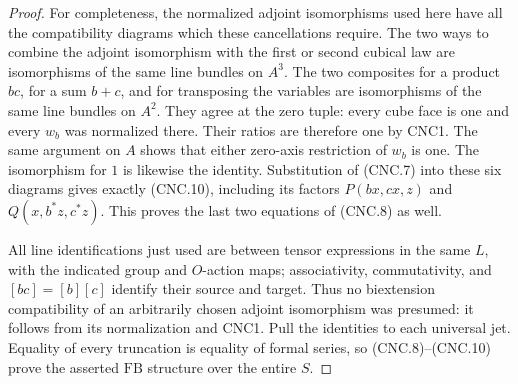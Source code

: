 \begin{proof}
For completeness, the normalized adjoint isomorphisms used here have
all the compatibility diagrams which these cancellations require.
The two ways to combine the adjoint isomorphism with the first or
second cubical law are isomorphisms of the same line bundles on
\(A^3\).  The two composites for a product \(bc\), for a sum
\(b+c\), and for transposing the variables are isomorphisms of
the same line bundles on \(A^2\).  They agree at the zero tuple:
every cube face is one and every \(w_b\) was normalized there.
Their ratios are therefore one by CNC1.  The same argument on \(A\)
shows that either zero-axis restriction of \(w_b\) is one.  The
isomorphism for \(1\) is likewise the identity.  Substitution of
(CNC.7) into these six diagrams gives exactly (CNC.10), including its
factors \(P(bx,cx,z)\) and \(Q(x,b^*z,c^*z)\).
This proves the last two equations of (CNC.8) as well.

All line identifications just used are between tensor expressions in
the same \(L\), with the indicated group and \(O\)-action maps;
associativity, commutativity, and \([bc]=[b][c]\) identify their
source and target.  Thus no biextension compatibility of an arbitrarily
chosen adjoint isomorphism was presumed: it follows from its
normalization and CNC1.  Pull the identities to each universal jet.
Equality of every truncation is equality of formal series, so
(CNC.8)--(CNC.10) prove the asserted \(\mathrm{FB}\) structure
over the entire \(S\).
\end{proof}

